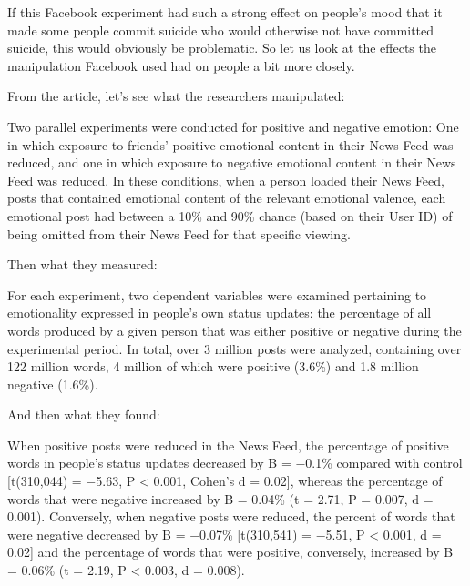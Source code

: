 \documentclass[
  oneside]{krantz}
\renewenvironment{quote}{\begin{VF}}{\end{VF}}
\begin{document}
If this Facebook experiment had such a strong effect on people's mood that it made some people commit suicide who would otherwise not have committed suicide, this would obviously be problematic. So let us look at the effects the manipulation Facebook used had on people a bit more closely.

From the article, let's see what the researchers manipulated:

\begin{quote}
Two parallel experiments were conducted for positive and negative emotion: One in which exposure to friends' positive emotional content in their News Feed was reduced, and one in which exposure to negative emotional content in their News Feed was reduced. In these conditions, when a person loaded their News Feed, posts that contained emotional content of the relevant emotional valence, each emotional post had between a 10\% and 90\% chance (based on their User ID) of being omitted from their News Feed for that specific viewing.
\end{quote}

Then what they measured:

\begin{quote}
For each experiment, two dependent variables were examined pertaining to emotionality expressed in people's own status updates: the percentage of all words produced by a given person that was either positive or negative during the experimental period. In total, over 3 million posts were analyzed, containing over 122 million words, 4 million of which were positive (3.6\%) and 1.8 million negative (1.6\%).
\end{quote}

And then what they found:

\begin{quote}
When positive posts were reduced in the News Feed, the percentage of positive words in people's status updates decreased by B = −0.1\% compared with control {[}t(310,044) = −5.63, P \textless{} 0.001, Cohen's d = 0.02{]}, whereas the percentage of words that were negative increased by B = 0.04\% (t = 2.71, P = 0.007, d = 0.001). Conversely, when negative posts were reduced, the percent of words that were negative decreased by B = −0.07\% {[}t(310,541) = −5.51, P \textless{} 0.001, d = 0.02{]} and the percentage of words that were positive, conversely, increased by B = 0.06\% (t = 2.19, P \textless{} 0.003, d = 0.008).
\end{quote}
\end{document}

